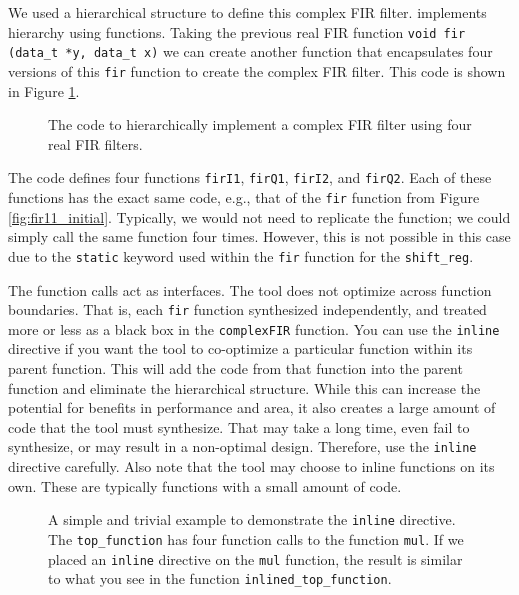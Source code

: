 We used a hierarchical structure to define this complex FIR filter. \VHLS implements hierarchy using functions. Taking the previous real FIR function \lstinline{void fir (data_t *y, data_t x)} we can create another function that encapsulates four versions of this \lstinline{fir} function to create the complex FIR filter. This code is shown in Figure \ref{fig:complex_fir_code}.

\begin{figure}

\caption{The \VHLS code to hierarchically implement a complex FIR filter using four real FIR filters.}
\label{fig:complex_fir_code}
\end{figure}

The code defines four functions \lstinline{firI1}, \lstinline{firQ1}, \lstinline{firI2}, and \lstinline{firQ2}. Each of these functions has the exact same code, e.g., that of the \lstinline{fir} function from Figure \ref{fig:fir11_initial}. Typically, we would not need to replicate the function; we could simply call the same function four times. However, this is not possible in this case due to the \lstinline{static} keyword used within the \lstinline{fir} function for the \lstinline{shift_reg}. 

The function calls act as interfaces. The \VHLS tool does not optimize across function boundaries. That is, each \lstinline{fir} function synthesized independently, and treated more or less as a black box in the \lstinline{complexFIR} function. You can use the \lstinline{inline} directive if you want the \VHLS tool to co-optimize a particular function within its parent function. This will add the code from that function into the parent function and eliminate the hierarchical structure. While this can increase the potential for benefits in performance and area, it also creates a large amount of code that the tool must synthesize. That may take a long time, even fail to synthesize, or may result in a non-optimal design. Therefore, use the \lstinline{inline} directive carefully. Also note that the \VHLS tool may choose to inline functions on its own. These are typically functions with a small amount of code.

\begin{figure}

\caption{ A simple and trivial example to demonstrate the \lstinline{inline} directive. The \lstinline{top_function} has four function calls to the function \lstinline{mul}. If we placed an \lstinline{inline} directive on the \lstinline{mul} function, the result is similar to what you see in the function \lstinline{inlined_top_function}. }
\label{fig:inline}
\end{figure}

